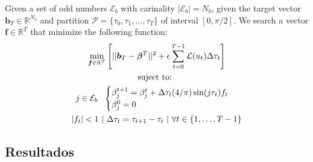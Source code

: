 \begin{problem}
    Given  a set of odd numbers $\mathcal{E}_b$ with carinality $|\mathcal{E}_b| = N_b$, given the target vector $\bm{b}_T  \in \mathbb{R}^{N_b}$ and  partition $\mathcal{P} = \{\tau_0,\tau_1,\dots,\tau_{T}\}$ of interval $[0,\pi/2]$. We search a vector $\bm{f} \in \mathbb{R}^{T}$ that minimize the following function:
    \begin{gather}
        \min_{\bm{f} \in \mathbb{R}^{T} } 
        \Bigg[ || \bm{b}_T - \bm{\beta}^{T}||^2 +
         \epsilon  \sum_{t=0}^{T-1} \mathcal{L}(u_{t}) \Delta\tau_t  \Bigg]  \\
        \notag \text{suject to: } \\
        \notag j \in \mathcal{E}_b \ \ 
        \begin{cases}
            \beta_j^{t+1} = \beta_j^{t} + \Delta \tau_t (4/\pi) \sin(j\tau_t) f_t \\
            \beta_j^0 = 0
        \end{cases} \\
        \notag |f_t| < 1 \  | \   \Delta \tau_t = \tau_{t+1} - \tau_{t} \ | \ \forall t \in \{1,\dots,T-1\}
    \end{gather}
\end{problem}

\subsection{Resultados}


